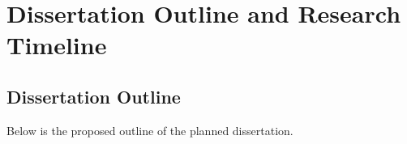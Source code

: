\documentclass{article}
\begin{document}


\newpage



\section{Dissertation Outline and Research Timeline}
\label{Sec:Outline}

\subsection{Dissertation Outline}
Below is the proposed outline of the planned dissertation.
\end{document}

